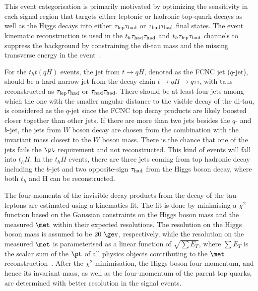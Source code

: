 This event categorisation is primarily motivated by optimizing the sensitivity in each signal region that targets either leptonic or hadronic top-quark
decays as well as the Higgs decays into either $\tau_{\mathrm{lep}} \tau_{\mathrm{had}}$ or $\tau_{\mathrm{had}} \tau_{\mathrm{had}}$ final states.   
The event kinematic reconstruction is used in the $t_h\tau_{\mathrm{had}} \tau_{\mathrm{had}}$ and $t_h\tau_{\mathrm{lep}} \tau_{\mathrm{had}}$ channels to suppress the background by constraining the
di-tau mass and the missing transverse energy in the event~\cite{Chen:2015nta}. 

For the $t_ht(qH)$ events, the jet from $t\to qH$, denoted as the FCNC jet ($q$-jet), should be a hard narrow jet from the
decay chain $t\to qH\to q\tau\tau$, with taus reconstructed as $\tau_{\mathrm{lep}} \tau_{\mathrm{had}}$ or $\tau_{\mathrm{had}} \tau_{\mathrm{had}}$.
There should be at least four jets among which the one with the smaller angular distance to the visible decay of the di-tau,
is considered as the $q$-jet since the FCNC top decay products are likely boosted closer together than other jets. 
If there are more than two jets besides the $q$- and $b$-jet, the jets from $W$ boson decay are chosen from the combination
with the invariant mass closest to the $W$ boson mass. There is the chance that one of the jets fails the $\pt$ requirement and not reconstructed.
This kind of events will fall into $t_hH$.
In the $t_hH$ events, there are three jets coming from top hadronic decay including the $b$-jet and two opposite-sign $\tau_{\mathrm{had}}$ from the Higgs boson decay, where
both $t_h$ and H can be reconstructed.  

The four-momenta of the invisible decay products from the decay of the tau-leptons 
are estimated using a kinematics fit. The fit is done by minimising a $\chi^2$ function based on the Gaussian constraints on the Higgs boson mass and the
measured $\met$ within their expected resolutions. The resolution on the Higgs boson mass is assumed to be $20~\gev$, respectively, while the resolution on the measured $\met$ is parameterised as a linear function of 
$\sqrt{\sum E_T}$, where $\sum E_T$ is the scalar sum of the $\pt$ of all physics objects contributing to the $\met$ reconstruction~\cite{Aaboud:2018tkc}.
After the $\chi^2$ minimisation, the Higgs boson four-momentum, and hence its invariant mass, as well as the 
four-momentum of the parent top quarks, are determined with better resolution in the signal events. 

